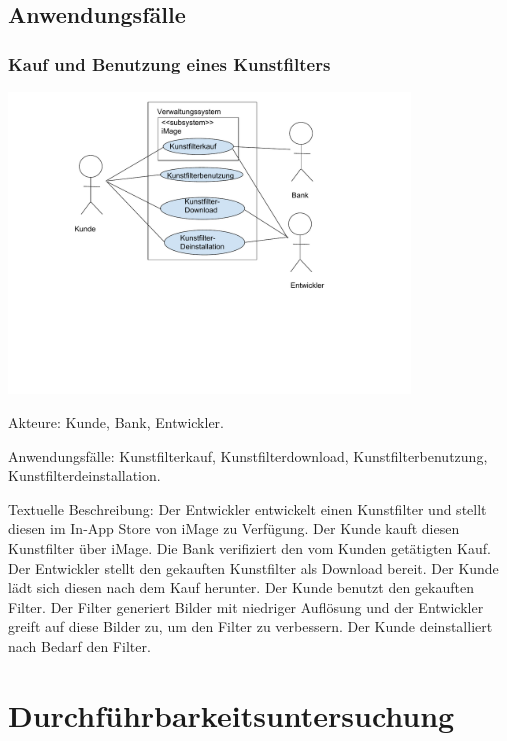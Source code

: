 \documentclass[parskip=full]{scrartcl}
\begin{document}
\subsection{Anwendungsfälle}
\subsubsection{Kauf und Benutzung eines Kunstfilters}
\begin{center}
\includegraphics[width=0.8\textwidth]{szenario_iMage_als_Kunstfilterapp.pdf}
\end{center}

Akteure: \gls{Kunde}, \gls{Bank}, \gls{Entwickler}.

Anwendungsfälle: Kunstfilterkauf, Kunstfilterdownload, Kunstfilterbenutzung, Kunstfilterdeinstallation.

Textuelle Beschreibung:
Der Entwickler entwickelt einen Kunstfilter und stellt diesen im \gls{In-App Store} von iMage zu Verfügung. Der Kunde kauft diesen Kunstfilter über iMage. Die Bank verifiziert den vom Kunden getätigten Kauf.
Der Entwickler stellt den gekauften Kunstfilter als Download bereit. Der Kunde lädt sich diesen nach dem Kauf herunter.
Der Kunde benutzt den gekauften Filter. Der Filter generiert Bilder mit niedriger Auflösung und der Entwickler greift auf diese Bilder zu, um den Filter zu verbessern.
Der Kunde deinstalliert nach Bedarf den Filter.


%
%

\printnoidxglossaries

\newpage
\section{Durchführbarkeitsuntersuchung}
\end{document}
